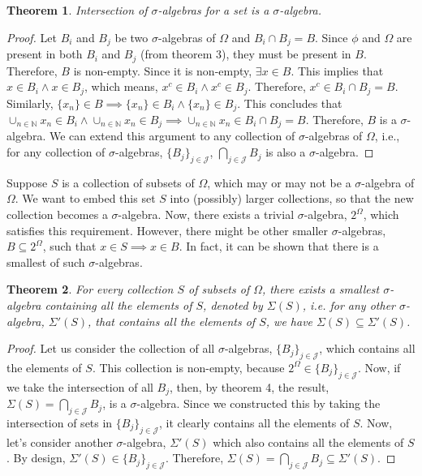 \documentclass{report}
\theoremstyle{plain}
\newtheorem{theorem}{Theorem}[chapter] %
\theoremstyle{definition}
\begin{document}
\begin{theorem}
Intersection of $\sigma$-algebras for a set is a $\sigma$-algebra.
\end{theorem}
\begin{proof}
Let $B_i$ and $B_j$ be two $\sigma$-algebras of $\Omega$ and $B_i\cap B_j=B$. Since $\phi$ and $\Omega$ are present in both $B_i$ and $B_j$ (from theorem 3), they must be present in $B$. Therefore, $B$ is non-empty. Since it is non-empty, $\exists x\in B$. This implies that $x\in B_i\wedge x\in B_j$, which means, $x^c\in B_i\wedge x^c\in B_j$. Therefore, $x^c\in B_i\cap B_j=B$. Similarly, $\{x_n\}\in B\implies \{x_n\}\in B_i\wedge\{x_n\}\in B_j$. This concludes that $\cup_{n\in\mathbb{N}} x_n\in B_i\wedge \cup_{n\in\mathbb{N}} x_n\in B_j\implies \cup_{n\in\mathbb{N}} x_n\in B_i\cap B_j=B$. Therefore, $B$ is a $\sigma$-algebra. We can extend this argument to any collection of $\sigma$-algebras of $\Omega$, i.e., for any collection of $\sigma$-algebras, $\{B_j\}_{j\in\mathcal{J}}$, $\bigcap_{j\in\mathcal{J}}B_j$ is also a $\sigma$-algebra.
\end{proof}
\noindent Suppose $S$ is a collection of subsets of $\Omega$, which may or may not be a $\sigma$-algebra of $\Omega$. We want to embed this set $S$ into (possibly) larger collections, so that the new collection becomes a $\sigma$-algebra. Now, there exists a trivial $\sigma$-algebra, $2^\Omega$, which satisfies this requirement. However, there might be other smaller $\sigma$-algebras, $B\subseteq 2^\Omega$, such that $x\in S\implies x\in B$. In fact, it can be shown that there is a smallest of such $\sigma$-algebras.
\begin{theorem}
For every collection $S$ of subsets of $\Omega$, there exists a smallest $\sigma$-algebra containing all the elements of $S$, denoted by $\Sigma(S)$, i.e. for any other $\sigma$-algebra, $\Sigma'(S)$, that contains all the elements of $S$, we have $\Sigma(S)\subseteq\Sigma'(S)$.
\end{theorem}
\begin{proof}
Let us consider the collection of all $\sigma$-algebras, $\{B_j\}_{j\in\mathcal{J}}$, which contains all the elements of $S$. This collection is non-empty, because $2^\Omega\in \{B_j\}_{j\in\mathcal{J}}$. Now, if we take the intersection of all $B_j$, then, by theorem 4, the result, $\Sigma(S)=\bigcap_{j\in\mathcal{J}} B_j$, is a $\sigma$-algebra. Since we constructed this by taking the intersection of sets in $\{B_j\}_{j\in\mathcal{J}}$, it clearly contains all the elements of $S$. Now, let's consider another $\sigma$-algebra, $\Sigma'(S)$ which also contains all the elements of $S$. By design, $\Sigma'(S)\in \{B_j\}_{j\in\mathcal{J}}$. Therefore, $\Sigma(S)=\bigcap_{j\in\mathcal{J}} B_j\subseteq\Sigma'(S)$.
\end{proof}
\end{document}
